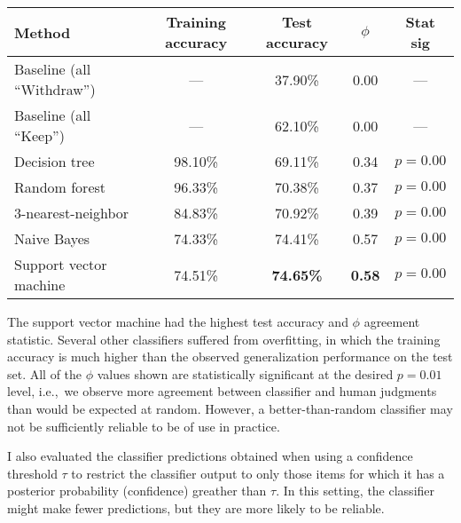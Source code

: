 \documentclass[man,11pt]{apa6}
\begin{document}

\singlespacing
\begin{center}
\begin{tabular}{|l|cc|cc|} \hline
Method & Training accuracy & Test accuracy & $\phi$ & Stat sig
\\ \hline
Baseline (all ``Withdraw'') & --- & 37.90\% & 0.00 & --- \\
Baseline (all ``Keep'') & --- & 62.10\% & 0.00 & --- \\ \hline
Decision tree          & 98.10\% & 69.11\% & 0.34 & $p=0.00$ \\
Random forest          & 96.33\% & 70.38\% & 0.37 & $p=0.00$ \\
3-nearest-neighbor     & 84.83\% & 70.92\% & 0.39 & $p=0.00$ \\
Naive Bayes            & 74.33\% & 74.41\% & 0.57 & $p=0.00$ \\
Support vector machine & 74.51\% & {\bf 74.65\%} & {\bf 0.58} & $p=0.00$ \\
\hline
\end{tabular}
\end{center}
\doublespacing

The support vector machine had the highest test accuracy and $\phi$
agreement statistic.  Several other classifiers suffered from
overfitting, in which the training accuracy is much higher than the
observed generalization performance on the test set.  All of the
$\phi$ values shown are statistically significant at the desired
$p=0.01$ level, i.e.,~we observe more agreement between classifier and
human judgments than would be expected at random.  However, a
better-than-random classifier may not be sufficiently reliable to be
of use in practice.

I also evaluated the classifier predictions obtained when using a
confidence threshold $\tau$ to restrict the classifier output to only
those items for which it has a posterior probability (confidence)
greather than $\tau$.  In this setting, the classifier might make
fewer predictions, but they are more likely to be reliable.
\end{document}
